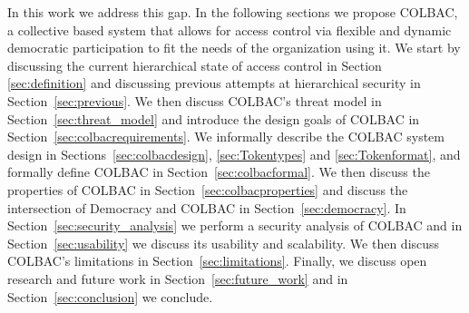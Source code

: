 In this work we address this gap. In the following sections we propose COLBAC, a
collective based system that allows for access control via flexible and dynamic
democratic participation to fit the needs of the organization using it. We start
by discussing the current hierarchical state of access control in Section
\ref{sec:definition} and discussing previous attempts at hierarchical security
in Section~\ref{sec:previous}. We then discuss COLBAC's threat model in
Section~\ref{sec:threat_model} and introduce the design goals of COLBAC in
Section~\ref{sec:colbacrequirements}. We informally describe the COLBAC
system design in Sections~\ref{sec:colbacdesign}, \ref{sec:Tokentypes} and 
\ref{sec:Tokenformat}, and formally define COLBAC in
Section~\ref{sec:colbacformal}. We then discuss the properties of COLBAC in
Section~\ref{sec:colbacproperties} and discuss the intersection of Democracy and
COLBAC in Section~\ref{sec:democracy}. In Section~\ref{sec:security_analysis} we
perform a security analysis of COLBAC and in Section~\ref{sec:usability} we
discuss its usability and scalability. We then discuss COLBAC's limitations
in Section~\ref{sec:limitations}. Finally, we discuss open research and future
work in Section~\ref{sec:future_work} and in Section~\ref{sec:conclusion} we
conclude.
%
%
